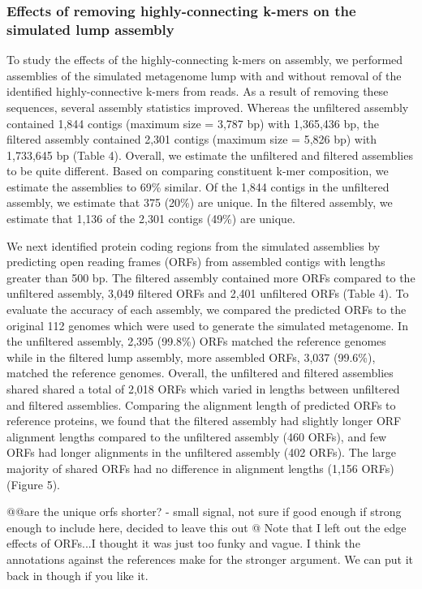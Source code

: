 \documentclass[11pt]{article} %
\begin{document}
\subsubsection{Effects of removing highly-connecting k-mers on the simulated lump assembly}
To study the effects of the highly-connecting k-mers on assembly, we performed assemblies of the simulated metagenome lump with and without removal of the identified highly-connective k-mers from reads.  As a result of removing these sequences, several assembly statistics improved.  Whereas the unfiltered assembly contained 1,844 contigs (maximum size = 3,787 bp) with 1,365,436 bp, the filtered assembly contained 2,301 contigs (maximum size = 5,826 bp) with 1,733,645 bp (Table 4).  Overall, we estimate the unfiltered and filtered assemblies to be quite different.  Based on comparing constituent k-mer composition, we estimate the assemblies to 69\% similar.  Of the 1,844 contigs in the unfiltered assembly, we estimate that 375 (20\%) are unique.  In the filtered assembly, we estimate that 1,136 of the 2,301 contigs (49\%) are unique. 
	
We next identified protein coding regions from the simulated assemblies by predicting open reading frames (ORFs) from assembled contigs with lengths greater than 500 bp.  The filtered assembly contained more ORFs compared to the unfiltered assembly, 3,049 filtered ORFs and 2,401 unfiltered ORFs (Table 4).  To evaluate the accuracy of each assembly, we compared the predicted ORFs to the original 112 genomes which were used to generate the simulated metagenome.  In the unfiltered assembly, 2,395 (99.8\%) ORFs matched the reference genomes while in the filtered lump assembly, more assembled ORFs, 3,037 (99.6\%), matched the reference genomes.  Overall, the unfiltered and filtered assemblies shared shared a total of 2,018 ORFs which varied in lengths between unfiltered and filtered assemblies.  Comparing the alignment length of predicted ORFs to reference proteins, we found that the filtered assembly had slightly longer ORF alignment lengths compared to the unfiltered assembly (460 ORFs), and few ORFs had longer alignments in the unfiltered assembly (402 ORFs).  The large majority of shared ORFs had no difference in alignment lengths (1,156 ORFs) (Figure 5).  

@@are the unique orfs shorter? - small signal, not sure if good enough if strong enough to include here, decided to leave this out
@ Note that I left out the edge effects of ORFs...I thought it was just too funky and vague.  I think the annotations against the references make for the stronger argument.  We can put it back in though if you like it.
\end{document}
